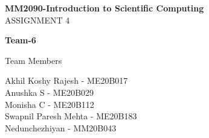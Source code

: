 \documentclass[a4paper,12pt]{article}
\begin{document}
\begin{titlepage}
    \begin{center}
        \vspace*{1cm}
        \Huge
        \textbf{MM2090-Introduction to Scientific Computing}\\
        \vspace{2cm}
        \LARGE
        ASSIGNMENT 4
        \vspace{1.5cm}
            
        \textbf{Team-6}
            
        \vfill
            
        Team Members
            
        \vspace{0.8cm}
            
        \Large
        Akhil Koshy Rajesh - ME20B017\\
        Anushka S - ME20B029\\
        Monisha C - ME20B112\\
        Swapnil Paresh Mehta - ME20B183\\
        Nedunchezhiyan - MM20B043
            
    \end{center}
\end{titlepage}

\tableofcontents
\newpage

\newpage

\newpage

\newpage

\newpage

\newpage


\end{document}
